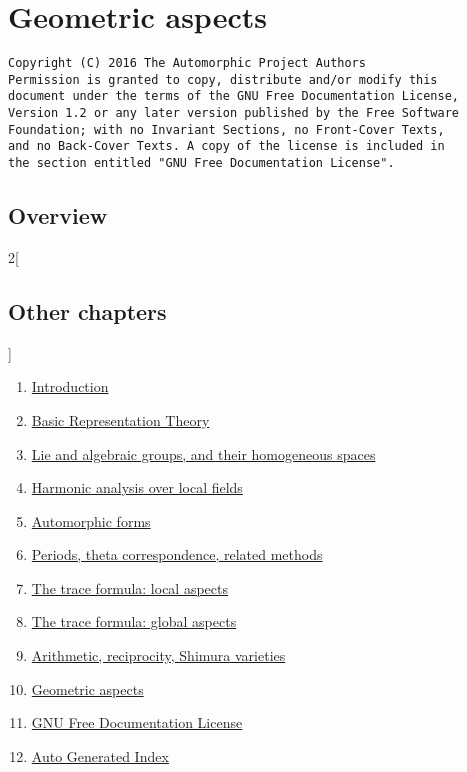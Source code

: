 \documentclass{stacks-project-book}
\theoremstyle{plain}
\theoremstyle{definition}
\theoremstyle{remark}
\numberwithin{equation}{subsection}
\begin{document}
%

\chapter{Geometric aspects}



\label{geometric-section-phantom}

\begin{verbatim}
Copyright (C) 2016 The Automorphic Project Authors
Permission is granted to copy, distribute and/or modify this
document under the terms of the GNU Free Documentation License,
Version 1.2 or any later version published by the Free Software
Foundation; with no Invariant Sections, no Front-Cover Texts,
and no Back-Cover Texts. A copy of the license is included in
the section entitled "GNU Free Documentation License".
\end{verbatim}



\section{Overview}
\label{geometric-section-overview}

\noindent




\begin{multicols}{2}[\section{Other chapters}]
\noindent
\begin{enumerate}
\item \hyperref[introduction-section-phantom]{Introduction}
\item \hyperref[representationtheory-section-phantom]{Basic Representation Theory}
\item \hyperref[algebraicgroups-section-phantom]{Lie and algebraic groups, and their homogeneous spaces}
\item \hyperref[harmonicanalysis-section-phantom]{Harmonic analysis over local fields}
\item \hyperref[automorphicforms-section-phantom]{Automorphic forms}
\item \hyperref[periods-section-phantom]{Periods, theta correspondence, related methods}
\item \hyperref[traceformulalocal-section-phantom]{The trace formula: local aspects}
\item \hyperref[traceformulaglobal-section-phantom]{The trace formula: global aspects}
\item \hyperref[arithmetic-section-phantom]{Arithmetic, reciprocity, Shimura varieties}
\item \hyperref[geometric-section-phantom]{Geometric aspects}
\item \hyperref[fdl-section-phantom]{GNU Free Documentation License}
\item \hyperref[index-section-phantom]{Auto Generated Index}
\end{enumerate}
\end{multicols}
\end{document}
